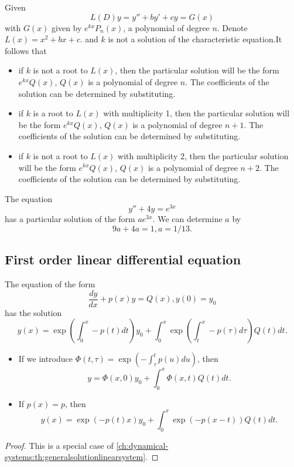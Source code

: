 \begin{refsection}
\begin{corollary}
	Given $$L(D)y = y'' + by' + cy = G(x)$$ with $G(x)$ given by $e^{kx}P_n(x)$, a polynomial of degree $n$.
	 Denote $L(x) = x^2+bx+c$.
	 and $k$ is not a solution of the characteristic equation.It follows that
	\begin{itemize}
		\item if $k$ is not a root to $L(x)$, then the particular solution will be the form $e^{kx}Q(x)$, $Q(x)$ is a polynomial of degree $n$. The coefficients of the solution can be determined by substituting. 
		\item if $k$ is a root to $L(x)$ with multiplicity 1, then the particular solution will be the form $e^{kx}Q(x)$, $Q(x)$ is a polynomial of degree $n+1$. The coefficients of the solution can be determined by substituting. 
		\item if $k$ is not a root to $L(x)$ with multiplicity 2, then the particular solution will be the form $e^{kx}Q(x)$, $Q(x)$ is a polynomial of degree $n+2$. The coefficients of the solution can be determined by substituting. 
	\end{itemize}
\end{corollary}

\begin{example}
	The equation
	$$y'' + 4y = e^{3x}$$
	has a particular solution of the form $ae^{3x}$.
	We can determine $a$ by
	$$9a + 4a = 1, a = 1/13.$$
\end{example}



\subsection{First order linear differential equation}
\begin{theorem}\label{ch:dynamical-systems:th:GeneralSolutionFirstOrderLinearODE}
The equation of the form
$$\frac{dy}{dx} + p(x)y = Q(x),y(0) = y_0$$
has the solution
$$y(x) = \exp(\int_0^x -p(t)dt)y_0 + \int_0^x \exp(\int_t^x -p(\tau)d\tau) Q(t)dt.$$
\begin{itemize}
	\item If we introduce $\Phi(t,\tau) = \exp(-\int_{\tau}^{t}p(u)du)$, then
	$$y = \Phi(x,0)y_0 + \int_0^x \Phi(x,t)Q(t)dt.$$
	\item If $p(x) = p$, then
	$$y(x) = \exp(-p(t)x)y_0 + \int_0^x \exp(-p(x-t)) Q(t)dt.$$
\end{itemize}
\end{theorem}
\begin{proof}
This is a special case of \autoref{ch:dynamical-systems:th:generalsolutionlinearsystem}.
\end{proof}


\end{refsection}
